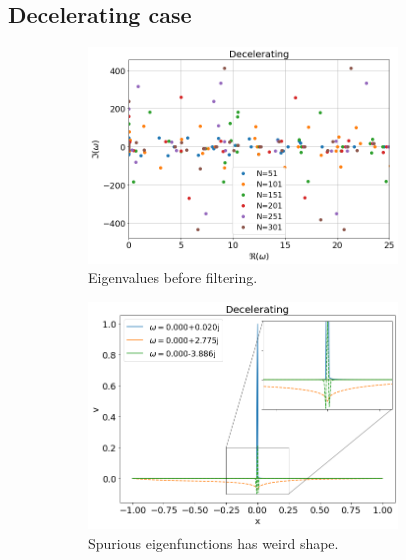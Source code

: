 \documentclass{article}
\begin{document}
    \subsection*{Decelerating case}
    \begin{figure}[H]
        \centering
        \begin{subfigure}[b]{0.5\textwidth}
            \includegraphics*[width=0.9\textwidth]{img/eigvals-decelerating.png}
            \caption{Eigenvalues before filtering.}
        \end{subfigure}%
        \begin{subfigure}[b]{0.5\textwidth}
            \includegraphics*[width=0.9\textwidth]{img/eigfuncs-decelerating.png}
            \caption{Spurious eigenfunctions has weird shape.}
        \end{subfigure}
        \begin{subfigure}[b]{0.5\textwidth}

\end{subfigure}
\end{figure}
\end{document}
